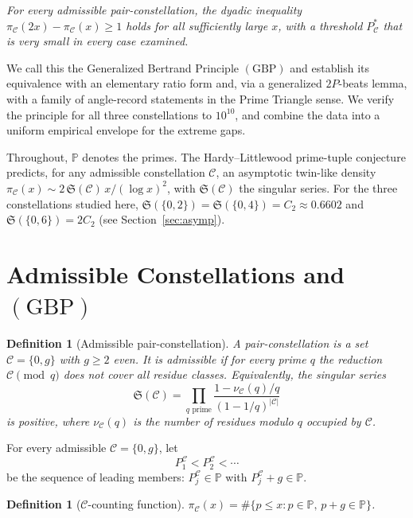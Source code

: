\documentclass[11pt]{article}
\newtheorem{definition}[theorem]{Definition}
\begin{document}
\begin{center}
\emph{For every admissible pair-constellation, the dyadic inequality
$\pi_\mathcal{C}(2x)-\pi_\mathcal{C}(x)\ge 1$ holds for all
sufficiently large $x$, with a threshold $P^{*}_\mathcal{C}$ that is
very small in every case examined.}
\end{center}

We call this the Generalized Bertrand Principle $(\mathrm{GBP})$ and
establish its equivalence with an elementary ratio form and, via a
generalized $2P$-beats lemma, with a family of angle-record
statements in the Prime Triangle sense. We verify the principle for
all three constellations to $10^{10}$, and combine the data into a
uniform empirical envelope for the extreme gaps.

Throughout, $\mathbb{P}$ denotes the primes. The Hardy--Littlewood
prime-tuple conjecture predicts, for any admissible constellation
$\mathcal{C}$, an asymptotic twin-like density
$\pi_\mathcal{C}(x)\sim 2\,\mathfrak{S}(\mathcal{C})\,x/(\log x)^2$,
with $\mathfrak{S}(\mathcal{C})$ the singular series. For the three
constellations studied here, $\mathfrak{S}(\{0,2\})=
\mathfrak{S}(\{0,4\})=C_2\approx 0.6602$ and
$\mathfrak{S}(\{0,6\})=2C_2$ (see Section~\ref{sec:asymp}).

\section{Admissible Constellations and $(\mathrm{GBP})$}

\begin{definition}[Admissible pair-constellation]
A \emph{pair-constellation} is a set $\mathcal{C}=\{0,g\}$ with
$g\ge 2$ even. It is \emph{admissible} if for every prime $q$ the
reduction $\mathcal{C}\pmod q$ does not cover all residue classes.
Equivalently, the singular series
\[
\mathfrak{S}(\mathcal{C})
=\prod_{q\text{ prime}}\frac{1-\nu_\mathcal{C}(q)/q}{(1-1/q)^{|\mathcal{C}|}}
\]
is positive, where $\nu_\mathcal{C}(q)$ is the number of residues
modulo $q$ occupied by $\mathcal{C}$.
\end{definition}

For every admissible $\mathcal{C}=\{0,g\}$, let
\[
P^{\mathcal{C}}_1<P^{\mathcal{C}}_2<\cdots
\]
be the sequence of leading members: $P^{\mathcal{C}}_j\in\mathbb{P}$
with $P^{\mathcal{C}}_j+g\in\mathbb{P}$.

\begin{definition}[$\mathcal{C}$-counting function]
$\pi_\mathcal{C}(x)=\#\{p\le x:p\in\mathbb{P},\,p+g\in\mathbb{P}\}$.
\end{definition}
\end{document}
